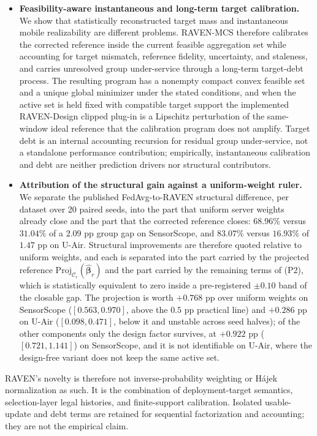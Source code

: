 \documentclass[letterpaper,journal]{IEEEtran}
\begin{document}
\begin{itemize}
    \item \textbf{Feasibility-aware instantaneous and long-term target
    calibration.}
    We show that statistically reconstructed target mass and instantaneous
    mobile realizability are different problems.  RAVEN-MCS therefore calibrates
    the corrected reference inside the current feasible aggregation set while
    accounting for target mismatch, reference fidelity, uncertainty, and
    staleness, and carries unresolved group under-service through a long-term
    target-debt process.  The resulting program has a nonempty compact convex
    feasible set and a unique global minimizer under the stated conditions, and
    when the active set is held fixed with compatible target support the
    implemented RAVEN-Design clipped plug-in is a Lipschitz perturbation of the
    same-window ideal reference that the calibration program does not amplify.
    Target debt is an internal accounting recursion for residual group
    under-service, not a standalone performance contribution; empirically,
    instantaneous calibration and debt are neither prediction drivers nor
    structural contributors.

    \item \textbf{Attribution of the structural gain against a uniform-weight
    ruler.}
    We separate the published FedAvg-to-RAVEN structural difference, per dataset
    over 20 paired seeds, into the part that uniform server weights already close
    and the part that the corrected reference closes: $68.96\%$ versus $31.04\%$
    of a $2.09$ pp group gap on SensorScope, and $83.07\%$ versus $16.93\%$ of
    $1.47$ pp on U-Air.  Structural improvements are therefore quoted relative to
    uniform weights, and each is separated into the part carried by the projected
    reference $\mathrm{Proj}_{\mathcal{C}_r}(\widehat{\boldsymbol\beta}_r)$ and
    the part carried by the remaining terms of (P2), which is statistically
    equivalent to zero inside a pre-registered $\pm0.10$ band of the closable
    gap.  The projection is worth $+0.768$ pp over uniform weights on SensorScope
    ($[0.563,0.970]$, above the $0.5$ pp practical line) and $+0.286$ pp on
    U-Air ($[0.098,0.471]$, below it and unstable across seed halves); of the
    other components only the design factor survives, at $+0.922$ pp
    ($[0.721,1.141]$) on SensorScope, and it is not identifiable on U-Air, where
    the design-free variant does not keep the same active set.
\end{itemize}

RAVEN's novelty is therefore not inverse-probability weighting or H\'ajek
normalization as such.  It is the combination of deployment-target semantics,
selection-layer legal histories, and finite-support calibration.
Isolated usable-update and debt terms are retained for sequential
factorization and accounting; they are not the empirical claim.
\end{document}
